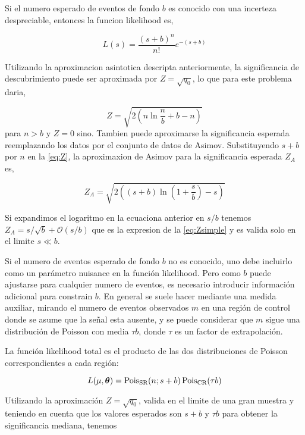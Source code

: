 Si el numero esperado de eventos de fondo $b$ es conocido con una incerteza despreciable,
entonces la funcion likelihood es,

\begin{equation}
  L(s) = \frac{(s+b)^n}{n!} e^{-(s+b)}
\end{equation}

Utilizando la aproximacion asintotica descripta anteriormente, la significancia de descubrimiento
puede ser aproximada por $Z=\sqrt{q_0}$, lo que para este problema daria,

\begin{equation}
  Z = \sqrt{2\left( n \ln \frac{n}{b} +b -n \right)}
  \label{eq:Z}
\end{equation}
%
para $n>b$ y $Z=0$ sino. Tambien puede aproximarse la significancia esperada reemplazando los datos
por el conjunto de datos de Asimov. Substituyendo $s+b$ por $n$ en la {\eq} \eqref{eq:Z}, la aproximaxion de
Asimov para la significancia esperada $Z_A$ es,

\begin{equation}
  Z_A = \sqrt{2\left( (s+b) \ln \left( 1 + \frac{s}{b}\right) - s \right)}
\end{equation}

Si expandimos el logaritmo en la ecuaciona anterior en $s/b$ tenemos $Z_A = s/\sqrt{b} + \mathcal{O}(s/b)$
que es la expresion de la {\eq} \eqref{eq:Zsimple} y es valida solo en el limite $s \ll b$.

Si el numero de eventos esperado de fondo $b$ no es conocido, uno debe incluirlo como
un parámetro nuisance en la función likelihood. Pero como $b$ puede ajustarse para cualquier
numero de eventos, es necesario introducir información adicional para constrain $b$. En general
se suele hacer mediante una medida auxiliar, mirando el numero de eventos observados $m$ en una
región de control donde se asume que la señal esta ausente, y se puede considerar que $m$ sigue
una distribución de Poisson con media $\tau b$, donde $\tau$ es un factor de extrapolación.

La función likelihood total es el producto de las dos distribuciones de Poisson correspondientes
a cada región:

\begin{equation}
  L(\mu, \bm{\theta}) = \operatorname{Pois}_\text{SR}(n;s+b) \operatorname{Pois}_\text{CR}(\tau b)
\end{equation}

Utilizando la aproximación $Z = \sqrt{q_0}$, valida en el limite de una gran muestra y
teniendo en cuenta que los valores esperados son $s+b$ y $\tau b$ para obtener la significancia
mediana, tenemos

